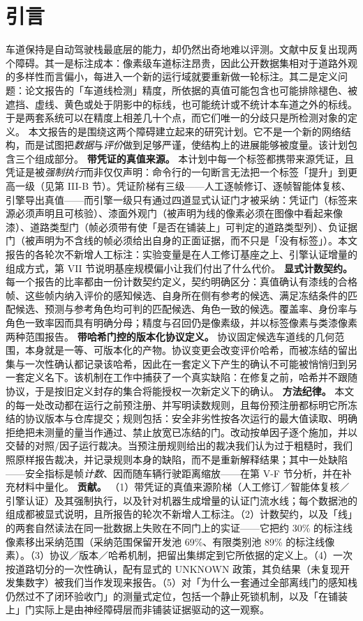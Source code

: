 \documentclass[journal]{IEEEtran}
\begin{document}
\section{引言}
车道保持是自动驾驶栈最底层的能力，却仍然出奇地难以评测。文献中反复出现两个障碍。其一是标注成本：像素级车道标注昂贵，因此公开数据集相对于道路外观的多样性而言偏小，每进入一个新的运行域就要重新做一轮标注。其二是定义问题：论文报告的「车道线检测」精度，所依据的真值可能包含也可能排除褪色、被遮挡、虚线、黄色或处于阴影中的标线，也可能统计或不统计本车道之外的标线。于是两套系统可以在精度上相差几十个点，而它们唯一的分歧只是所检测对象的定义。
本文报告的是围绕这两个障碍建立起来的研究计划。它不是一个新的网络结构，而是试图把\emph{数据}与\emph{评价}做到足够严谨，使结构上的进展能够被度量。该计划包含三个组成部分。
\textbf{带凭证的真值来源。} 本计划中每一个标签都携带来源凭证，且凭证是被\emph{强制执行}而非仅仅声明：命令行的一句断言无法把一个标签「提升」到更高一级（见第 III-B 节）。凭证阶梯有三级------人工逐帧修订、逐帧智能体复核、引擎导出真值------而引擎一级只有通过四道显式认证门才被采纳：凭证门（标签来源必须声明且可核验）、漆面外观门（被声明为线的像素必须在图像中看起来像漆）、道路类型门（帧必须带有使「是否在铺装上」可判定的道路类型列）、负证据门（被声明为不含线的帧必须给出自身的正面证据，而不只是「没有标签」）。本文报告的各轮次不新增人工标注：实验变量是在人工修订基座之上、引擎认证增量的组成方式，第 VII 节说明基座规模偏小让我们付出了什么代价。
\textbf{显式计数契约。} 每一个报告的比率都由一份计数契约定义，契约明确区分：真值确认有漆线的合格帧、这些帧内纳入评价的感知候选、自身所在侧有参考的候选、满足冻结条件的匹配候选、预测与参考角色均可判的匹配候选、角色一致的候选。覆盖率、身份率与角色一致率因而具有明确分母；精度与召回仍是像素级，并以标签像素与类漆像素两种范围报告。
\textbf{带哈希门控的版本化协议定义。} 协议固定候选车道线的几何范围，本身就是一等、可版本化的产物。协议变更会改变评价哈希，而被冻结的留出集与一次性确认都记录该哈希，因此在一套定义下产生的确认不可能被悄悄归到另一套定义名下。该机制在工作中捕获了一个真实缺陷：在修复之前，哈希并不跟随协议，于是按旧定义封存的集合将能授权一次新定义下的确认。
\textbf{方法纪律。} 本文的每一处改动都在运行之前预注册、并写明读数规则，且每份预注册都标明它所冻结的协议版本与仓库提交；规则包括：安全非劣性按各次运行的最大值读取、明确拒绝把未测量的量当作通过、禁止放宽已冻结的门。改动按单因子逐个施加，并以交替的对照/因子运行裁决。当预注册规则给出的裁决我们认为过于粗糙时，我们照原样报告裁决，并记录规则本身的缺陷，而不是重新解释结果；其中一处缺陷------安全指标是帧\emph{计数}、因而随车辆行驶距离缩放------在第 V-F 节分析，并在补充材料中量化。
\textbf{贡献。} （1）带凭证的真值来源阶梯（人工修订／智能体复核／引擎认证）及其强制执行，以及针对机器生成增量的认证门流水线；每个数据池的组成都被显式说明，且所报告的轮次不新增人工标注。（2）计数契约，以及「线」的两套自然读法在同一批数据上失败在不同门上的实证------它把约 30\% 的标注线像素移出采纳范围（采纳范围保留开发池 69\%、有限类别池 89\% 的标注线像素）。（3）协议／版本／哈希机制，把留出集绑定到它所依据的定义上。（4）一次按道路切分的一次性确认，配有显式的 UNKNOWN 政策，其负结果（未复现开发集数字）被我们当作发现来报告。（5）对「为什么一套通过全部离线门的感知栈仍然过不了闭环验收门」的测量式定位，包括一个静止死锁机制，以及「在铺装上」门实际上是由神经障碍层而非铺装证据驱动的这一观察。
\end{document}
